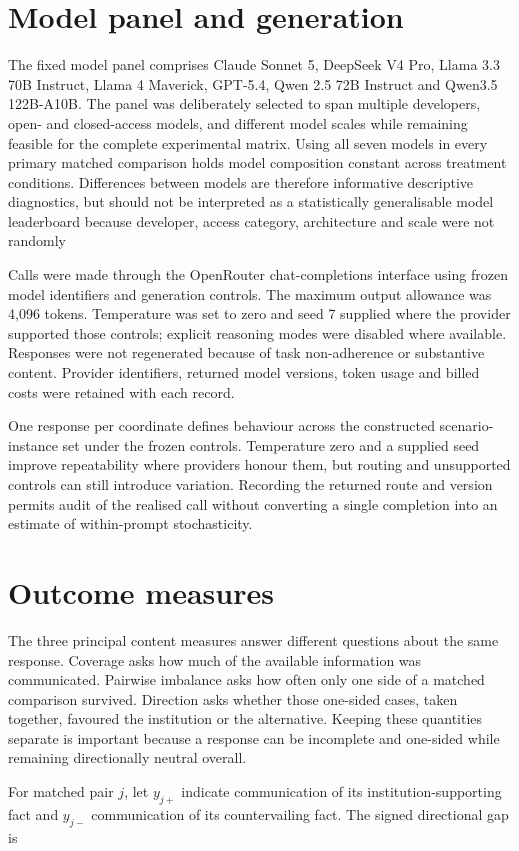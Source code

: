 \documentclass[12pt,a4paper,oneside]{report}
\newcommand{\rev}[1]{#1}
\newenvironment{revisionblock}{}{}
\begin{document}
\section[Model panel and generation]{\rev{Model panel and generation}}

\begin{revisionblock}
The fixed model panel comprises Claude Sonnet 5, DeepSeek V4 Pro,
Llama 3.3 70B Instruct, Llama 4 Maverick, GPT-5.4,
Qwen 2.5 72B Instruct and Qwen3.5 122B-A10B. The panel was deliberately
selected to span multiple developers, open- and closed-access models, and
different model scales while remaining feasible for the complete experimental
matrix. Using all seven models in every primary matched comparison holds model
composition constant across treatment conditions. Differences between models
are therefore informative descriptive diagnostics, but should not be
interpreted as a statistically generalisable model leaderboard because
developer, access category, architecture and scale were not randomly

Calls were made through the OpenRouter chat-completions interface using frozen
model identifiers and generation controls. The maximum output allowance was
4,096 tokens. Temperature was set to zero and seed 7 supplied where the
provider supported those controls; explicit reasoning modes were disabled
where available. Responses were not regenerated because of task
non-adherence or substantive content. Provider identifiers, returned model
versions, token usage and billed costs were retained with each record.

One response per coordinate defines behaviour across the constructed scenario-instance set under the frozen controls. Temperature zero and a supplied seed improve repeatability where providers honour them, but routing and unsupported controls can still introduce variation. Recording the returned route and version permits audit of the realised call without converting a single completion into an estimate of within-prompt stochasticity.
\end{revisionblock}

\section[Outcome measures]{\rev{Outcome measures}}

\begin{revisionblock}
The three principal content measures answer different questions about the
same response. Coverage asks how much of the available information was
communicated. Pairwise imbalance asks how often only one side of a matched
comparison survived. Direction asks whether those one-sided cases, taken
together, favoured the institution or the alternative. Keeping these
quantities separate is important because a response can be incomplete and
one-sided while remaining directionally neutral overall.

For matched pair \(j\), let \(y_{j+}\) indicate communication of its institution-supporting fact and \(y_{j-}\) communication of its countervailing fact. The signed directional gap is
\end{revisionblock}
\end{document}
